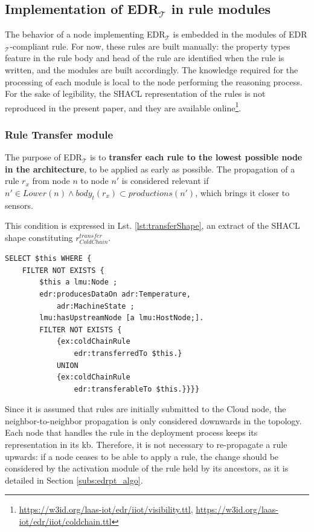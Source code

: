 \documentclass{iosart2c}
\newcommand{\edrt}{EDR$_{\mathcal{T}}$\xspace}
\begin{document}
\subsection{Implementation of \edrt in rule modules}
\label{subs:edrt_modules}
The behavior of a node implementing \edrt is embedded in the modules of \edrt-compliant rule.
For now, these rules are built manually: the property types feature in the rule body and head of the rule are identified when the rule is written, and the modules are built accordingly.
The knowledge required for the processing of each module is local to the node performing the reasoning process. 
For the sake of legibility, the SHACL representation of the rules is not reproduced in the present paper, and they are available online\footnote{\url{https://w3id.org/laas-iot/edr/iiot/visibility.ttl}, \url{https://w3id.org/laas-iot/edr/iiot/coldchain.ttl}}.

\subsubsection{Rule Transfer module}

The purpose of \edrt is to \textbf{transfer each rule to the lowest possible node in the architecture}, to be applied as early as possible. 
The propagation of a rule $r_{x}$ from node $n$ to node $n'$ is considered relevant if $n' \in Lower(n) \land body_t(r_{x}) \subset productions(n')$, which brings it closer to sensors. 

This condition is expressed in Lst. \ref{lst:transferShape}, an extract of the SHACL shape constituting $r_{ColdChain}^{transfer}$.
%
\begin{lstlisting}[float, caption=$r_{ColdChain}^{transfer}$ shape, label=lst:transferShape]
SELECT $this WHERE {
	FILTER NOT EXISTS {
		$this a lmu:Node ;
		edr:producesDataOn adr:Temperature,
			adr:MachineState ;
		lmu:hasUpstreamNode [a lmu:HostNode;].
		FILTER NOT EXISTS {
			{ex:coldChainRule 
				edr:transferredTo $this.}
			UNION
			{ex:coldChainRule 
				edr:transferableTo $this.}}}}
\end{lstlisting}

Since it is assumed that rules are initially submitted to the Cloud node, the neighbor-to-neighbor propagation is only considered downwards in the topology.
Each node that handles the rule in the deployment process keeps its representation in its \gls{kb}.
Therefore, it is not necessary to re-propagate a rule upwards: if a node ceases to be able to apply a rule, the change should be considered by the activation module of the rule held by its ancestors, as it is detailed in Section \textsection \ref{subs:edrpt_algo}.
\end{document}
